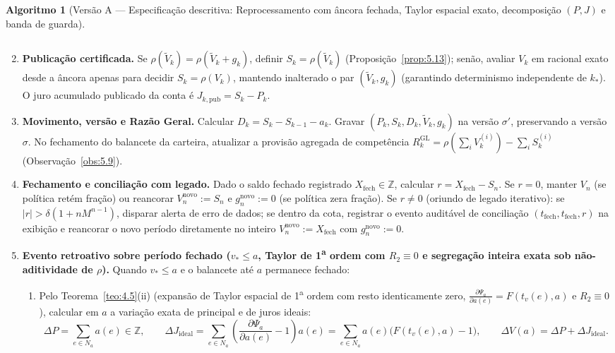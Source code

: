 \documentclass[11pt, a4paper]{article}
\theoremstyle{definition}
\newtheorem{algoritmo}[definicao]{Algoritmo}
\theoremstyle{plain}
\theoremstyle{remark}
\begin{document}
\begin{algoritmo}[Versão A — Especificação descritiva: Reprocessamento com âncora fechada, Taylor espacial exato, decomposição $(P, J)$ e banda de guarda]
\begin{enumerate}[label=\textbf{\arabic*.}]
\begin{itemize}
\[        \]
    \end{itemize}
    \item \textbf{Publicação certificada.} Se $\rho(\tilde{V}_k) = \rho(\tilde{V}_k + g_k)$, definir $S_k = \rho(\tilde{V}_k)$ (Proposição~\ref{prop:5.13}); senão, avaliar $V_k$ em racional exato desde a âncora apenas para decidir $S_k = \rho(V_k)$, mantendo inalterado o par $(\tilde{V}_k, g_k)$ (garantindo determinismo independente de $k_*$). O juro acumulado publicado da conta é $J_{k,\text{pub}} = S_k - P_k$.
    \item \textbf{Movimento, versão e Razão Geral.} Calcular $D_k = S_k - S_{k-1} - a_k$. Gravar $(P_k, S_k, D_k, \tilde{V}_k, g_k)$ na versão $\sigma'$, preservando a versão $\sigma$. No fechamento do balancete da carteira, atualizar a provisão agregada de competência $R_k^{\text{GL}} = \rho(\sum_i V_k^{(i)}) - \sum_i S_k^{(i)}$ (Observação~\ref{obs:5.9}).
    \item \textbf{Fechamento e conciliação com legado.} Dado o saldo fechado registrado $X_{\text{fech}} \in \mathbb{Z}$, calcular $r = X_{\text{fech}} - S_n$. Se $r = 0$, manter $V_n$ (se política retém fração) ou reancorar $V_n^{\text{novo}} := S_n$ e $g_n^{\text{novo}} := 0$ (se política zera fração). Se $r \neq 0$ (oriundo de legado iterativo): se $|r| > \delta(1 + n M^{n-1})$, disparar alerta de erro de dados; se dentro da cota, registrar o evento auditável de conciliação $(t_{\text{fech}}, t_{\text{fech}}, r)$ na exibição e reancorar o novo período diretamente no inteiro $V_n^{\text{novo}} := X_{\text{fech}}$ com $g_n^{\text{novo}} := 0$.
    \item \textbf{Evento retroativo sobre período fechado ($v_* \le a$, Taylor de 1\textsuperscript{a} ordem com $R_2 \equiv 0$ e segregação inteira exata sob não-aditividade de $\rho$).} Quando $v_* \le a$ e o balancete até $a$ permanece fechado:
    \begin{enumerate}[label=(\alph*)]
        \item Pelo Teorema~\ref{teo:4.5}(ii) (expansão de Taylor espacial de 1\textsuperscript{a} ordem com resto identicamente zero, $\frac{\partial \Psi_a}{\partial a(e)} = F(t_v(e), a)$ e $R_2 \equiv 0$), calcular em $a$ a variação exata de principal e de juros ideais:
        \[
        \Delta P = \sum_{e \in N_a} a(e) \in \mathbb{Z}, \qquad \Delta J_{\text{ideal}} = \sum_{e \in N_a} \left(\frac{\partial \Psi_a}{\partial a(e)} - 1\right)a(e) = \sum_{e \in N_a} a(e)\big(F(t_v(e), a) - 1\big), \qquad \Delta V(a) = \Delta P + \Delta J_{\text{ideal}}.
        \]

\end{enumerate}
\end{enumerate}
\end{algoritmo}
\end{document}
